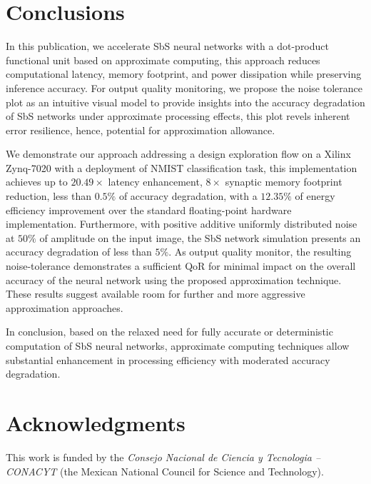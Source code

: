 \section{Conclusions}
\label{sec:conclusions}
In this publication, we accelerate SbS neural networks with a dot-product functional unit based on approximate computing, this approach reduces computational latency, memory footprint, and power dissipation while preserving inference accuracy. For output quality monitoring, we propose the noise tolerance plot as an intuitive visual model to provide insights into the accuracy degradation of SbS networks under approximate processing effects, this plot revels inherent error resilience, hence, potential for approximation allowance.

We demonstrate our approach addressing a design exploration flow on a Xilinx Zynq-7020 with a deployment of NMIST classification task, this implementation achieves up to $20.49\times$ latency enhancement, $8\times$ synaptic memory footprint reduction, less than $0.5\%$ of accuracy degradation, with a $12.35\%$ of energy efficiency improvement over the standard floating-point hardware implementation. Furthermore, with positive additive uniformly distributed noise at $50\%$ of amplitude on the input image, the SbS network simulation presents an accuracy degradation of less than $5\%$. As output quality monitor, the resulting noise-tolerance demonstrates a sufficient QoR for minimal impact on the overall accuracy of the neural network using the proposed approximation technique. These results suggest available room for further and more aggressive approximation approaches.

In conclusion, based on the relaxed need for fully accurate or deterministic computation of SbS neural networks, approximate computing techniques allow substantial enhancement in processing efficiency with moderated accuracy degradation.

\section * {Acknowledgments}\label{sec:Ack}
This work is funded by the \textit{Consejo Nacional de Ciencia y Tecnologia -- CONACYT} (the Mexican National Council for Science and Technology).
